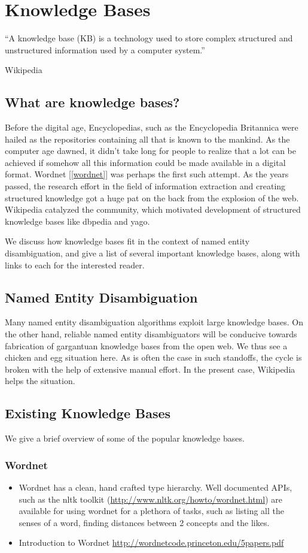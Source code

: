 \chapter{Knowledge Bases}
\epigraph{``A knowledge base (KB) is a technology used to store complex structured and unstructured information used by a computer system.''}{Wikipedia}

\section{What are knowledge bases?}
Before the digital age, Encyclopedias, such as the Encyclopedia Britannica were hailed as the repositories containing
all that is known to the mankind. As the computer age dawned, it didn't take long for people to realize that a lot
can be achieved if somehow all this information could be made available in a digital format.
Wordnet [\ref{wordnet}] was perhaps the first such attempt. As the years passed, the research effort in the field of information extraction and creating 
structured knowledge got a huge pat on the back from the explosion of the web. Wikipedia catalyzed the community, which motivated development 
of structured knowledge bases like dbpedia and yago.

We discuss how knowledge bases fit in the context of named entity disambiguation, and give a list of several
important knowledge bases, along with links to each for the interested reader.

\section{Named Entity Disambiguation}

Many named entity disambiguation algorithms exploit large knowledge bases.
On the other hand, reliable named entity disambiguators will be conducive towards
fabrication of gargantuan knowledge bases from the open web. We thus see 
a chicken and egg situation here. As is often the case in such standoffs, the cycle is
broken with the help of extensive manual effort. In the present case, Wikipedia helps the
situation.


\section{Existing Knowledge Bases}
We give a brief overview of some of the popular knowledge bases.
\subsection{Wordnet}
\begin{itemize}
 \item Wordnet has a clean, hand crafted type hierarchy. Well documented APIs, such as the nltk toolkit
(\url{http://www.nltk.org/howto/wordnet.html}) are available for using wordnet for a 
plethora of tasks, such as listing all the senses of a word, finding distances between 
2 concepts and the likes.
 \item Introduction to Wordnet \url{http://wordnetcode.princeton.edu/5papers.pdf}
\end{itemize}

